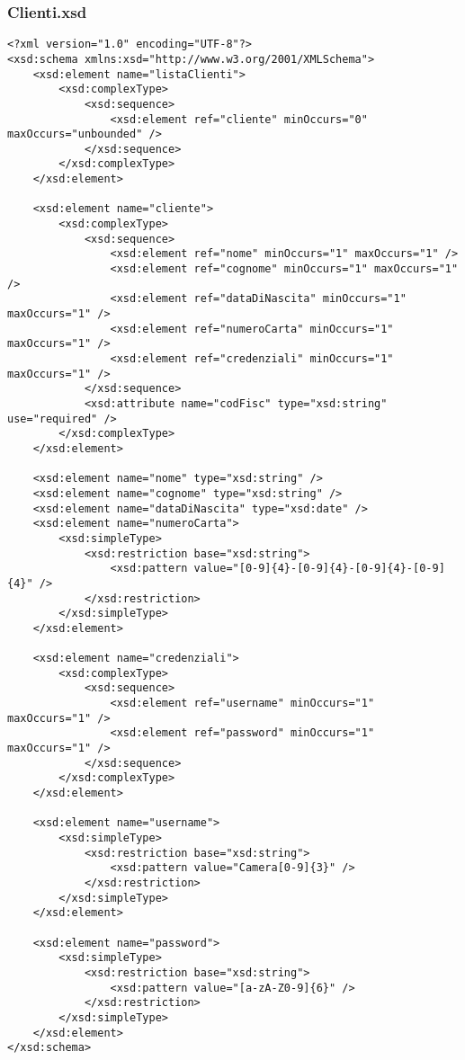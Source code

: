 \documentclass [a4paper, 12pt]{book}
\begin{document}
\subsubsection{Clienti.xsd}
\begin{lstlisting}[style=XML]
<?xml version="1.0" encoding="UTF-8"?>
<xsd:schema xmlns:xsd="http://www.w3.org/2001/XMLSchema">
    <xsd:element name="listaClienti">
        <xsd:complexType>
            <xsd:sequence>
                <xsd:element ref="cliente" minOccurs="0" maxOccurs="unbounded" />
            </xsd:sequence>
        </xsd:complexType>
    </xsd:element>

    <xsd:element name="cliente">
        <xsd:complexType>
            <xsd:sequence>
                <xsd:element ref="nome" minOccurs="1" maxOccurs="1" />
                <xsd:element ref="cognome" minOccurs="1" maxOccurs="1" />
                <xsd:element ref="dataDiNascita" minOccurs="1" maxOccurs="1" />
                <xsd:element ref="numeroCarta" minOccurs="1" maxOccurs="1" />
                <xsd:element ref="credenziali" minOccurs="1" maxOccurs="1" />
            </xsd:sequence>
            <xsd:attribute name="codFisc" type="xsd:string"  use="required" />
        </xsd:complexType>
    </xsd:element>

    <xsd:element name="nome" type="xsd:string" />
    <xsd:element name="cognome" type="xsd:string" />
    <xsd:element name="dataDiNascita" type="xsd:date" />
    <xsd:element name="numeroCarta">
        <xsd:simpleType>
            <xsd:restriction base="xsd:string">
                <xsd:pattern value="[0-9]{4}-[0-9]{4}-[0-9]{4}-[0-9]{4}" />
            </xsd:restriction>
        </xsd:simpleType>
    </xsd:element>

    <xsd:element name="credenziali">
        <xsd:complexType>
            <xsd:sequence>
                <xsd:element ref="username" minOccurs="1" maxOccurs="1" />
                <xsd:element ref="password" minOccurs="1" maxOccurs="1" />
            </xsd:sequence>
        </xsd:complexType>
    </xsd:element>

    <xsd:element name="username">
        <xsd:simpleType>
            <xsd:restriction base="xsd:string">
                <xsd:pattern value="Camera[0-9]{3}" />
            </xsd:restriction>
        </xsd:simpleType>
    </xsd:element>
    
    <xsd:element name="password">
        <xsd:simpleType>
            <xsd:restriction base="xsd:string">
                <xsd:pattern value="[a-zA-Z0-9]{6}" />
            </xsd:restriction>
        </xsd:simpleType>
    </xsd:element>
</xsd:schema>
\end{lstlisting}\pagebreak
\end{document}
